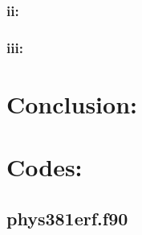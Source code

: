 \documentclass[twocolumn]{article}
\begin{document}
\subsubsection{ii:}														
\subsubsection{iii:}														
\section{Conclusion:}
\section{Codes:}
\subsection{phys381erf.f90}\label{[phys381erf.f90]}
\end{document}
